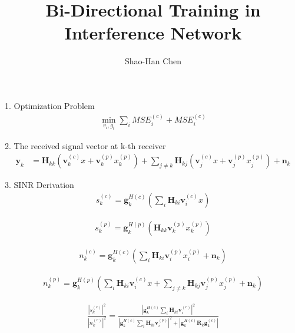 \documentclass[11pt, oneside]{article}   	%
\title{Bi-Directional Training in Interference Network}
\author{Shao-Han Chen}
\begin{document}
\maketitle

1. Optimization Problem
\begin{align*}
\min_{v_{i} , g_{i}} \displaystyle\sum_{i} MSE^{(c)}_{i}+MSE^{(c)}_{i}
\end{align*}

2. The received signal vector at k-th receiver
\begin{align*}
\textbf{y}_{k} &= \textbf{H}_{kk}
			(\textbf{v}^{(c)}_{k}x
			+\textbf{v}^{(p)}_{k}x^{(p)}_{k})
			+\displaystyle\sum_{j \neq k}\textbf{H}_{kj}(\textbf{v}^{(c)}_{j}x+\textbf{v}^{(p)}_{j}x^{(p)}_{j})
			+\textbf{n}_{k}
\end{align*}

3. SINR Derivation
\begin{align*}
s^{(c)}_{k} = \textbf{g}^{H(c)}_{k}
		(\displaystyle\sum_{i}
		\textbf{H}_{ki} 
		\textbf{v}^{(c)}_{i}x)
\end{align*}

\begin{align*}
s^{(p)}_{k} = \textbf{g}^{H(p)}_{k}
		(\textbf{H}_{kk} 
		\textbf{v}^{(p)}_{k}x^{(p)}_{k})
\end{align*}

\begin{align*}
n^{(c)}_{k} = \textbf{g}^{H(c)}_{k}
		(\displaystyle\sum_{i}
		\textbf{H}_{ki} 
		\textbf{v}^{(p)}_{i}x^{(p)}_{i}
		+\textbf{n}_{k})
\end{align*}

\begin{align*}
n^{(p)}_{k} = \textbf{g}^{H(p)}_{k}
		(\displaystyle\sum_{i}
		\textbf{H}_{ki} 
		\textbf{v}^{(c)}_{i}x
		+\displaystyle\sum_{j \neq k}\textbf{H}_{kj}\textbf{v}^{(p)}_{j}x^{(p)}_{j}
		+\textbf{n}_{k})
\end{align*}

\begin{align*}
\frac	{	|s^{(c)}_{k}|^2	}{	|n^{(c)}_{k}|^2	} = 
\frac {|\textbf{g}^{H(c)}_{k}
		\displaystyle\sum_{i}
		\textbf{H}_{ki} 
		\textbf{v}^{(c)}_{i}|^2	
	} 
	{	|\textbf{g}^{H(c)}_{k}
		\displaystyle\sum_{i}
		\textbf{H}_{ki} 
		\textbf{v}^{(p)}_{i}|^2
		+|\textbf{g}^{H(c)}_{k}
		\textbf{R}_{k}
		\textbf{g}^{(c)}_{k}|
	}
\end{align*}
\end{document}
